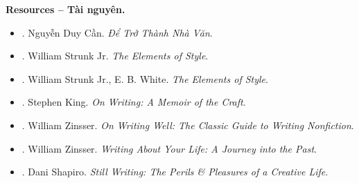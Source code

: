 \documentclass[12pt]{article}
\begin{document}
\noindent\textbf{\textsf{Resources -- Tài nguyên.}}
\begin{itemize}
	\item \cite{Can_dtnv}. Nguyễn Duy Cần. {\it Để Trở Thành Nhà Văn}.
	\item \cite{Strunk1918}. William Strunk Jr. {\it The Elements of Style}.
	\item \cite{Strunk_White2019}. William Strunk Jr., E. B. White. {\it The Elements of Style}.
	\item \cite{King2000,King2010}. Stephen King. {\it On Writing: A Memoir of the Craft}.
	\item \cite{Zinsser2001,Zinsser2016}. William Zinsser. {\it On Writing Well: The Classic Guide to Writing Nonfiction}.
	\item \cite{Zinsser2005}. William Zinsser. {\it Writing About Your Life: A Journey into the Past}.
	\item \cite{Shapiro2014}. Dani Shapiro. {\it Still Writing: The Perils \& Pleasures of a Creative Life}.
\end{itemize}
\end{document}
